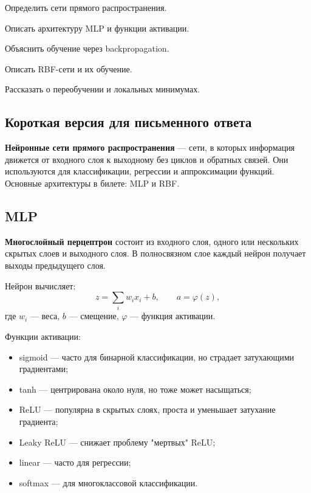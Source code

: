 
\begin{examplan}
    \item Определить сети прямого распространения.
    \item Описать архитектуру MLP и функции активации.
    \item Объяснить обучение через backpropagation.
    \item Описать RBF-сети и их обучение.
    \item Рассказать о переобучении и локальных минимумах.
\end{examplan}

\subsection*{Короткая версия для письменного ответа}

\textbf{Нейронные сети прямого распространения} --- сети, в которых информация движется от входного слоя к выходному без циклов и обратных связей. Они используются для классификации, регрессии и аппроксимации функций. Основные архитектуры в билете: MLP и RBF.

\subsection*{MLP}

\textbf{Многослойный перцептрон} состоит из входного слоя, одного или нескольких скрытых слоев и выходного слоя. В полносвязном слое каждый нейрон получает выходы предыдущего слоя.

Нейрон вычисляет:
\[
z=\sum_i w_i x_i+b,\qquad a=\varphi(z),
\]
где $w_i$ --- веса, $b$ --- смещение, $\varphi$ --- функция активации.

Функции активации:
\begin{itemize}
    \item sigmoid --- часто для бинарной классификации, но страдает затухающими градиентами;
    \item tanh --- центрирована около нуля, но тоже может насыщаться;
    \item ReLU --- популярна в скрытых слоях, проста и уменьшает затухание градиента;
    \item Leaky ReLU --- снижает проблему "мертвых" ReLU;
    \item linear --- часто для регрессии;
    \item softmax --- для многоклассовой классификации.
\end{itemize}


